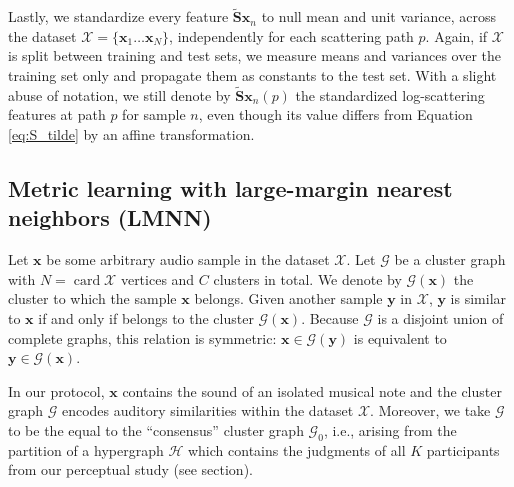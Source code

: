 \documentclass{bmcart}
\DeclareMathOperator*{\card}{card}
\newcommand{\lnameref}[1]{%
\bgroup
\let\nmu\MakeLowercase
\nameref{#1}\egroup}
\newcommand{\nmu}{}
\begin{document}
Lastly, we standardize every feature $\mathbf{\widetilde{S}}\boldsymbol{x}_n$ to null mean and unit variance, across the dataset $\mathcal{X} = \{\boldsymbol{x}_1 \ldots \boldsymbol{x}_N\}$, independently for each scattering path $p$.
Again, if $\mathcal{X}$ is split between training and test sets, we measure means and variances over the training set only and propagate them as constants to the test set.
With a slight abuse of notation, we still denote by $\mathbf{\widetilde{S}}\boldsymbol{x}_n (p)$ the standardized log-scattering features at path $p$ for sample $n$, even though its value differs from Equation \ref{eq:S_tilde} by an affine transformation.



\subsection*{Metric learning with large-margin nearest neighbors (LMNN)}
Let $\boldsymbol{x}$ be some arbitrary audio sample in the dataset $\mathcal{X}$.
Let $\mathcal{G}$ be a cluster graph with $N = \card \mathcal{X}$ vertices and $C$ clusters in total.
We denote by $\mathcal{G}(\boldsymbol{x})$ the cluster to which the sample $\boldsymbol{x}$ belongs.
Given another sample $\boldsymbol{y}$ in $\mathcal{X}$, $\boldsymbol{y}$ is similar to $\boldsymbol{x}$ if and only if belongs to the cluster $\mathcal{G}(\boldsymbol{x})$.
Because $\mathcal{G}$ is a disjoint union of complete graphs, this relation is symmetric: $\boldsymbol{x} \in \mathcal{G}(\boldsymbol{y})$ is equivalent to $\boldsymbol{y} \in \mathcal{G}(\boldsymbol{x})$.

In our protocol, $\boldsymbol{x}$ contains the sound of an isolated musical note and the cluster graph $\mathcal{G}$ encodes auditory similarities within the dataset $\mathcal{X}$.
Moreover, we take $\mathcal{G}$ to be the equal to the ``consensus'' cluster graph $\mathcal{G}_0$, i.e., arising from the partition of a hypergraph $\mathcal{H}$ which contains the judgments of all $K$ participants from our perceptual study (see \lnameref{sec:data-collection} section).

\end{document}
